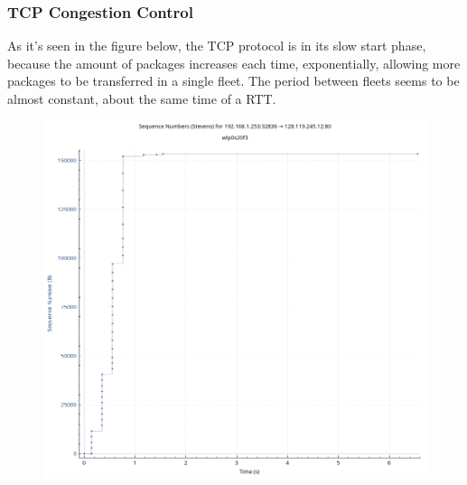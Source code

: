 \subsubsection{TCP Congestion Control}

As it's seen in the figure below, the TCP protocol is in its slow start phase,
because the amount of packages increases each time, exponentially, allowing
more packages to be transferred in a single fleet. The period between fleets
seems to be almost constant, about the same time of a RTT.

\begin{figure}[htbp]
	\centering
	\includegraphics[width=1\linewidth]{img/fourth_experience/2.png}
	\caption{}\label{fig:4_1}
\end{figure}

